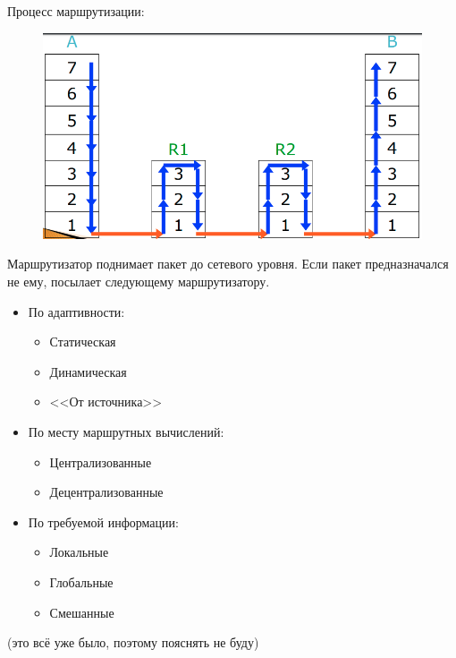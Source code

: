 Процесс маршрутизации:

\begin{figure}[H]
  \centering
  \includegraphics[width=15cm]{images/04/01}
\end{figure}

Маршрутизатор поднимает пакет до сетевого уровня. Если пакет предназначался не ему, посылает следующему маршрутизатору.


\begin{itemize}
    \item По адаптивности:
    \begin{itemize}
        \item Статическая
        \item Динамическая
        \item <<От источника>>
    \end{itemize}
    \item По месту маршрутных вычислений:
    \begin{itemize}
        \item Централизованные
        \item Децентрализованные
    \end{itemize}
    \item По требуемой информации:
    \begin{itemize}
        \item Локальные
        \item Глобальные
        \item Смешанные
    \end{itemize}
\end{itemize}

(это всё уже было, поэтому пояснять не буду)


